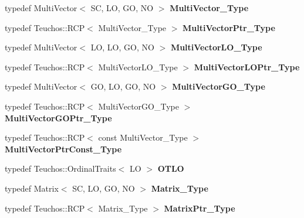\begin{DoxyCompactItemize}
\item 
\mbox{\label{classFEDD_1_1RefinementFactory_ae656c560626c10f5fc6722f43e4281fc}} 
typedef Multi\+Vector$<$ SC, LO, GO, NO $>$ {\bfseries Multi\+Vector\+\_\+\+Type}
\item 
\mbox{\label{classFEDD_1_1RefinementFactory_ae422943f76cfe9ada609671de16eb9c8}} 
typedef Teuchos\+::\+R\+CP$<$ Multi\+Vector\+\_\+\+Type $>$ {\bfseries Multi\+Vector\+Ptr\+\_\+\+Type}
\item 
\mbox{\label{classFEDD_1_1RefinementFactory_adad31caec4b769abf8658c67001f977b}} 
typedef Multi\+Vector$<$ LO, LO, GO, NO $>$ {\bfseries Multi\+Vector\+L\+O\+\_\+\+Type}
\item 
\mbox{\label{classFEDD_1_1RefinementFactory_a9d82d2ea10ef7ec6d16da19105a29a57}} 
typedef Teuchos\+::\+R\+CP$<$ Multi\+Vector\+L\+O\+\_\+\+Type $>$ {\bfseries Multi\+Vector\+L\+O\+Ptr\+\_\+\+Type}
\item 
\mbox{\label{classFEDD_1_1RefinementFactory_aa9c88666e02916392baafb0f6f32a9ed}} 
typedef Multi\+Vector$<$ GO, LO, GO, NO $>$ {\bfseries Multi\+Vector\+G\+O\+\_\+\+Type}
\item 
\mbox{\label{classFEDD_1_1RefinementFactory_a5593f5b047bcd78698da8d9d6c4a7e44}} 
typedef Teuchos\+::\+R\+CP$<$ Multi\+Vector\+G\+O\+\_\+\+Type $>$ {\bfseries Multi\+Vector\+G\+O\+Ptr\+\_\+\+Type}
\item 
\mbox{\label{classFEDD_1_1RefinementFactory_a1104aa640a212baca89d8193713bbafc}} 
typedef Teuchos\+::\+R\+CP$<$ const Multi\+Vector\+\_\+\+Type $>$ {\bfseries Multi\+Vector\+Ptr\+Const\+\_\+\+Type}
\item 
\mbox{\label{classFEDD_1_1RefinementFactory_ad2ca2ac7d7bb5251e9546a8a81077a34}} 
typedef Teuchos\+::\+Ordinal\+Traits$<$ LO $>$ {\bfseries O\+T\+LO}
\item 
\mbox{\label{classFEDD_1_1RefinementFactory_a57f322063d7692248463f5f4fe859a25}} 
typedef Matrix$<$ SC, LO, GO, NO $>$ {\bfseries Matrix\+\_\+\+Type}
\item 
\mbox{\label{classFEDD_1_1RefinementFactory_afc9db004cde1ce278146dceb3533f2a9}} 
typedef Teuchos\+::\+R\+CP$<$ Matrix\+\_\+\+Type $>$ {\bfseries Matrix\+Ptr\+\_\+\+Type}
\end{DoxyCompactItemize}

